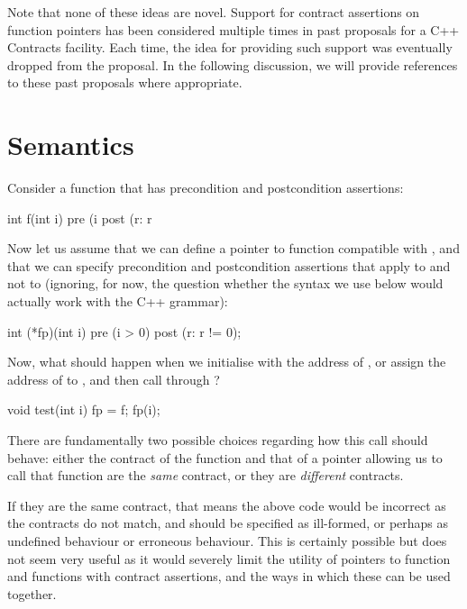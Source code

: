 Note that none of these ideas are novel. Support for contract assertions on function pointers has been considered multiple times in past proposals for a C++ Contracts facility. Each time, the idea for providing such support was eventually dropped from the proposal. In the following discussion, we will provide references to these past proposals where appropriate.

\section{Semantics}
Consider a function that has precondition and postcondition assertions:
\begin{codeblock}
int f(int i)
  pre (i %
  post (r: r %
\end{codeblock}
Now let us assume that we can define a pointer to function  compatible with , and that we can specify precondition and postcondition assertions that apply to  and not to  (ignoring, for now, the question whether the syntax we use below would actually work with the C++ grammar):
\begin{codeblock}
int (*fp)(int i) 
  pre (i > 0) 
  post (r: r != 0);
\end{codeblock}
Now, what should happen when we initialise  with the address of , or assign the address of  to , and then call  through ?
\begin{codeblock}  
void test(int i) {
  fp = f;    
  fp(i);
}
\end{codeblock}
There are fundamentally two possible choices regarding how this call should behave: either the contract of the function and that of a pointer allowing us to call that function are the \emph{same} contract, or they are \emph{different} contracts.


If they are the same contract, that means the above code would be incorrect as the contracts do not match, and should be specified as ill-formed, or perhaps as undefined behaviour or erroneous behaviour. This is certainly possible but does not seem very useful as it would severely limit the utility of pointers to function and functions with contract assertions, and the ways in which these can be used together.


